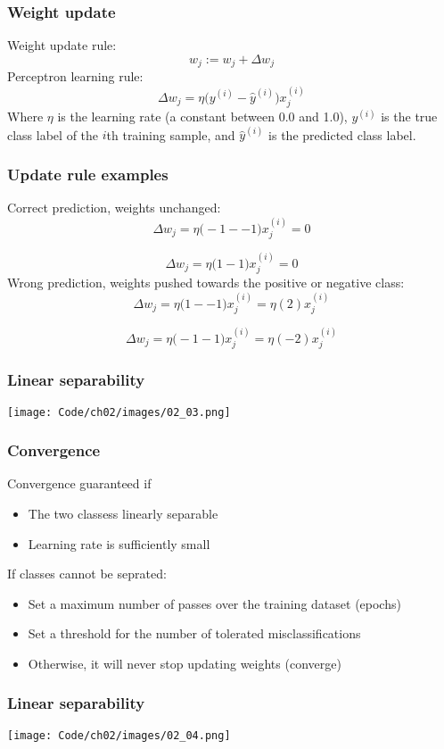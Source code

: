 \documentclass{beamer}
\begin{document}
\begin{frame}
  \frametitle{Weight update}
  Weight update rule:
  \[
  w_j := w_j + \Delta w_j
  \]
  Perceptron learning rule:
  \[
  \Delta w_j = \eta \bigg( y^{(i)} - \hat{y}^{(i)} \bigg)x_{j}^{(i)}
  \]
  Where $\eta$ is the learning rate (a constant between 0.0 and 1.0), $y^{(i)}$ is the true class label of the $i$th training sample, and $\hat{y}^{(i)}$ is the predicted class label.
\end{frame}

\begin{frame}
  \frametitle{Update rule examples}
  Correct prediction, weights unchanged:
  \[
  \Delta w_j = \eta \bigg( -1 -- 1 \bigg)x_{j}^{(i)} = 0
  \]

  \[
  \Delta w_j = \eta \bigg( 1-1 \bigg)x_{j}^{(i)} = 0
  \]
  Wrong prediction, weights pushed towards the positive or negative class:
  \[
  \Delta w_j = \eta \bigg( 1 -- 1 \bigg)x_{j}^{(i)} = \eta(2)x_{j}^{(i)}
  \]

  \[
  \Delta w_j = \eta \bigg( -1-1 \bigg)x_{j}^{(i)} = \eta(-2)x_{j}^{(i)}
  \]
\end{frame}

\begin{frame}
  \frametitle{Linear separability}
  \texttt{[image: Code/ch02/images/02\_03.png]}
\end{frame}

\begin{frame}
  \frametitle{Convergence}
  Convergence guaranteed if
  \begin{itemize}
  \item The two classess linearly separable
  \item Learning rate is sufficiently small
  \end{itemize}
  If classes cannot be seprated:
  \begin{itemize}
  \item Set a maximum number of passes over the training dataset (epochs)
  \item Set a threshold for the number of tolerated misclassifications
  \item Otherwise, it will never stop updating weights (converge)
  \end{itemize}
\end{frame}

\begin{frame}
  \frametitle{Linear separability}
  \texttt{[image: Code/ch02/images/02\_04.png]}
\end{frame}
\end{document}
